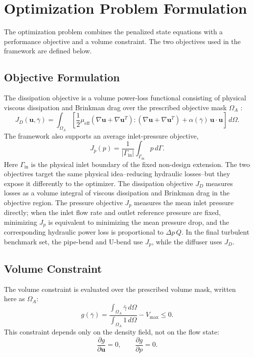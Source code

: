 \section{Optimization Problem Formulation}
\label{sec:optimization_problem}
The optimization problem combines the penalized state equations with a performance objective and a volume constraint. The two objectives used in the framework are defined below.

\subsection{Objective Formulation}
\label{subsec:objective_formulation}
The dissipation objective is a volume power-loss functional consisting of physical viscous dissipation and Brinkman drag over the prescribed objective mask $\Omega_A$ \cite{Yoon2016,Dilgen2018}:
\begin{equation}
	J_D(\mathbf{u},\bar{\gamma}) =
	\int_{\Omega_A}
	\left[
	\frac{1}{2}\mu_{\mathrm{eff}}
	\left(\nabla\mathbf{u}+\nabla\mathbf{u}^{T}\right):
	\left(\nabla\mathbf{u}+\nabla\mathbf{u}^{T}\right)
	+
	\alpha(\bar{\gamma})\,\mathbf{u}\cdot\mathbf{u}
	\right]\,d\Omega .
	\label{eq:dissipation_objective}
\end{equation}
The framework also supports an average inlet-pressure objective,
\begin{equation}
	J_p(p) =
	\frac{1}{|\Gamma_{\mathrm{in}}|}
	\int_{\Gamma_{\mathrm{in}}} p\,d\Gamma .
	\label{eq:inlet_pressure_objective}
\end{equation}
Here $\Gamma_{\mathrm{in}}$ is the physical inlet boundary of the fixed non-design extension. The two objectives target the same physical idea--reducing hydraulic losses--but they expose it differently to the optimizer. The dissipation objective $J_D$ measures losses as a volume integral of viscous dissipation and Brinkman drag in the objective region. The pressure objective $J_p$ measures the mean inlet pressure directly; when the inlet flow rate and outlet reference pressure are fixed, minimizing $J_p$ is equivalent to minimizing the mean pressure drop, and the corresponding hydraulic power loss is proportional to $\Delta p\,Q$. In the final turbulent benchmark set, the pipe-bend and U-bend use $J_p$, while the diffuser uses $J_D$.

\subsection{Volume Constraint}
The volume constraint is evaluated over the prescribed volume mask, written here as $\Omega_A$:
\begin{equation}
	g(\bar{\gamma}) =
	\frac{\int_{\Omega_A} \bar{\gamma}\,d\Omega}
	{\int_{\Omega_A} 1\,d\Omega}
	- V_{\max}
	\leq 0 .
	\label{eq:volume_constraint}
\end{equation}
This constraint depends only on the density field, not on the flow state:
\begin{equation}
	\frac{\partial g}{\partial \mathbf{u}}=0,
	\qquad
	\frac{\partial g}{\partial p}=0 .
	\label{eq:volume_constraint_state_independence}
\end{equation}

